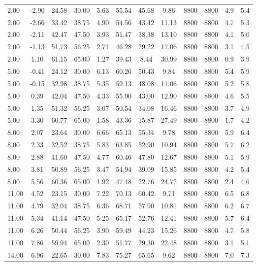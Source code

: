\documentclass[english]{SPFShortReport}
\begin{document}
\begin{table}[!ht]
\begin{small}
\begin{center}
{\begin{tabular}{l | c c c c c c c c c c c }
2.00 & -2.90 & 24.58 & 30.00 & 5.63 & 55.54 & 45.68 & 9.86 & 8800 & 8800 & 4.9 & 5.4\\ 
2.00 & -2.66 & 33.42 & 38.75 & 4.90 & 54.56 & 43.42 & 11.13 & 8800 & 8800 & 4.7 & 5.3\\ 
2.00 & -2.11 & 42.47 & 47.50 & 3.93 & 51.47 & 38.38 & 13.10 & 8800 & 8800 & 4.1 & 5.0\\ 
2.00 & -1.13 & 51.73 & 56.25 & 2.71 & 46.28 & 29.22 & 17.06 & 8800 & 8800 & 3.1 & 4.5\\ 
2.00 & 1.10 & 61.15 & 65.00 & 1.27 & 39.43 & 8.44 & 30.99 & 8800 & 8800 & 0.9 & 3.9\\ 
5.00 & -0.41 & 24.12 & 30.00 & 6.13 & 60.26 & 50.43 & 9.84 & 8800 & 8800 & 5.4 & 5.9\\ 
5.00 & -0.15 & 32.98 & 38.75 & 5.35 & 59.13 & 48.08 & 11.06 & 8800 & 8800 & 5.2 & 5.8\\ 
5.00 & 0.39 & 42.04 & 47.50 & 4.33 & 55.90 & 43.00 & 12.90 & 8800 & 8800 & 4.6 & 5.5\\ 
5.00 & 1.35 & 51.32 & 56.25 & 3.07 & 50.54 & 34.08 & 16.46 & 8800 & 8800 & 3.7 & 4.9\\ 
5.00 & 3.30 & 60.77 & 65.00 & 1.58 & 43.36 & 15.87 & 27.49 & 8800 & 8800 & 1.7 & 4.2\\ 
8.00 & 2.07 & 23.64 & 30.00 & 6.66 & 65.13 & 55.34 & 9.78 & 8800 & 8800 & 5.9 & 6.4\\ 
8.00 & 2.33 & 32.52 & 38.75 & 5.83 & 63.85 & 52.90 & 10.94 & 8800 & 8800 & 5.7 & 6.2\\ 
8.00 & 2.88 & 41.60 & 47.50 & 4.77 & 60.46 & 47.80 & 12.67 & 8800 & 8800 & 5.1 & 5.9\\ 
8.00 & 3.81 & 50.89 & 56.25 & 3.47 & 54.94 & 39.09 & 15.85 & 8800 & 8800 & 4.2 & 5.4\\ 
8.00 & 5.56 & 60.36 & 65.00 & 1.92 & 47.48 & 22.76 & 24.72 & 8800 & 8800 & 2.4 & 4.6\\ 
11.00 & 4.52 & 23.15 & 30.00 & 7.22 & 70.13 & 60.42 & 9.71 & 8800 & 8800 & 6.5 & 6.8\\ 
11.00 & 4.79 & 32.04 & 38.75 & 6.36 & 68.71 & 57.90 & 10.81 & 8800 & 8800 & 6.2 & 6.7\\ 
11.00 & 5.34 & 41.14 & 47.50 & 5.25 & 65.17 & 52.76 & 12.41 & 8800 & 8800 & 5.7 & 6.4\\ 
11.00 & 6.26 & 50.44 & 56.25 & 3.90 & 59.49 & 44.23 & 15.26 & 8800 & 8800 & 4.7 & 5.8\\ 
11.00 & 7.86 & 59.94 & 65.00 & 2.30 & 51.77 & 29.30 & 22.48 & 8800 & 8800 & 3.1 & 5.1\\ 
14.00 & 6.96 & 22.65 & 30.00 & 7.83 & 75.27 & 65.65 & 9.62 & 8800 & 8800 & 7.0 & 7.3\\ 

\end{tabular}}
\end{center}
\end{small}
\end{table}
\end{document}

